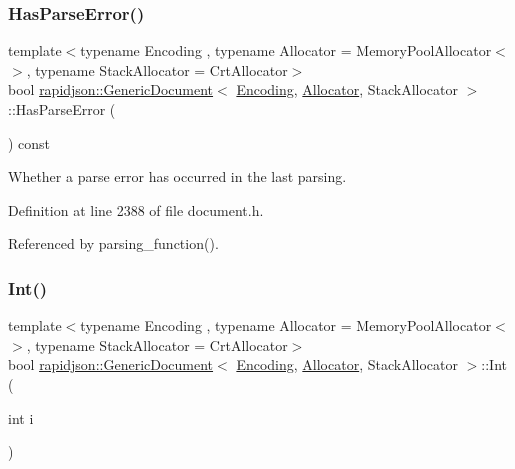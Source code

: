 \subsubsection{\texorpdfstring{HasParseError()}{HasParseError()}}
{\footnotesize\ttfamily template$<$typename Encoding , typename Allocator  = Memory\+Pool\+Allocator$<$$>$, typename Stack\+Allocator  = Crt\+Allocator$>$ \\
bool \mbox{\hyperlink{classrapidjson_1_1_generic_document}{rapidjson\+::\+Generic\+Document}}$<$ \mbox{\hyperlink{classrapidjson_1_1_encoding}{Encoding}}, \mbox{\hyperlink{classrapidjson_1_1_allocator}{Allocator}}, Stack\+Allocator $>$\+::Has\+Parse\+Error (\begin{DoxyParamCaption}{ }\end{DoxyParamCaption}) const}



Whether a parse error has occurred in the last parsing. 



Definition at line 2388 of file document.\+h.


\begin{DoxyCode}{0}

\end{DoxyCode}


Referenced by parsing\+\_\+function().

\mbox{\label{classrapidjson_1_1_generic_document_abadda08ccb7404576e74104916329c21}} 
\subsubsection{\texorpdfstring{Int()}{Int()}}
{\footnotesize\ttfamily template$<$typename Encoding , typename Allocator  = Memory\+Pool\+Allocator$<$$>$, typename Stack\+Allocator  = Crt\+Allocator$>$ \\
bool \mbox{\hyperlink{classrapidjson_1_1_generic_document}{rapidjson\+::\+Generic\+Document}}$<$ \mbox{\hyperlink{classrapidjson_1_1_encoding}{Encoding}}, \mbox{\hyperlink{classrapidjson_1_1_allocator}{Allocator}}, Stack\+Allocator $>$\+::Int (\begin{DoxyParamCaption}\item[{int}]{i }\end{DoxyParamCaption})}



